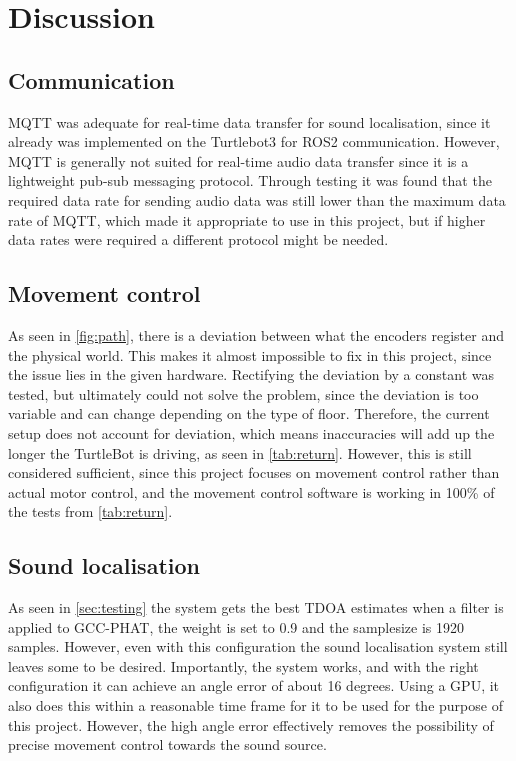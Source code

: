 \section{Discussion}\label{SEC:discussion}
\subsection{Communication}
MQTT was adequate for real-time data transfer for sound localisation, since it already was implemented on the Turtlebot3 for ROS2 communication. However, MQTT is generally not suited for real-time audio data transfer since it is a lightweight pub-sub messaging protocol. Through testing it was found that the required data rate for sending audio data was still lower than the maximum data rate of MQTT, which made it appropriate to use in this project, but if higher data rates were required a different protocol might be needed.


\subsection{Movement control}

As seen in \cref{fig:path}, there is a deviation between what the encoders register and the physical world. This makes it almost impossible to fix in this project, since the issue lies in the given hardware. Rectifying the deviation by a constant was tested, but ultimately could not solve the problem, since the deviation is too variable and can change depending on the type of floor. Therefore, the current setup does not account for deviation, which means inaccuracies will add up the longer the TurtleBot is driving, as seen in \cref{tab:return}. However, this is still considered sufficient, since this project focuses on movement control rather than actual motor control, and the movement control software is working in 100\% of the tests from \cref{tab:return}.


\subsection{Sound localisation}
As seen in \cref{sec:testing} the system gets the best TDOA estimates when a filter is applied to GCC-PHAT, the weight is set to 0.9 and the samplesize is 1920 samples. However, even with this configuration the sound localisation system still leaves some to be desired. Importantly, the system works, and with the right configuration it can achieve an angle error of about 16 degrees. Using a GPU, it also does this within a reasonable time frame for it to be used for the purpose of this project. However, the high angle error effectively removes the possibility of precise movement control towards the sound source. 

